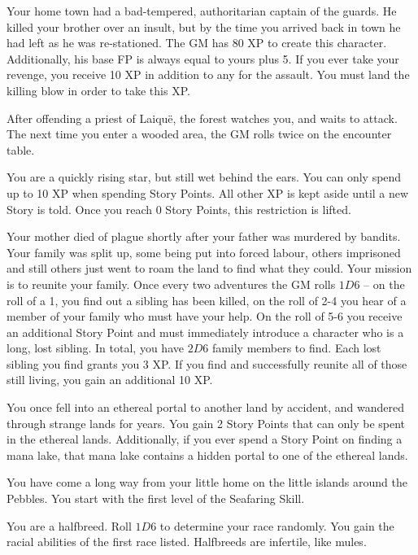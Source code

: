 \begin{multicols}{2}
\begin{list}{\addtocounter{list}{1}\textbf{:}}{\raggedleft}
	\item{Your home town had a bad-tempered, authoritarian captain of the guards.
He killed your brother over an insult, but by the time you arrived back in town he had left as he was re-stationed.
The GM has 80 XP to create this character.
Additionally, his base FP is always equal to yours plus 5.
If you ever take your revenge, you receive 10 XP in addition to any for the assault.
You must land the killing blow in order to take this XP.}
	\item{After offending a priest of Laiqu\"{e}, the forest watches you, and waits to attack.  The next time you enter a wooded area, the GM rolls twice on the encounter table.}

	\item{You are a quickly rising star, but still wet behind the ears.
	You can only spend up to 10 XP when spending Story Points.
	All other XP is kept aside until a new Story is told.
	Once you reach 0 Story Points, this restriction is lifted.}
	
	\item{Your mother died of plague shortly after your father was murdered by bandits.  Your family was split up, some being put into forced labour, others imprisoned and still others just went to roam the land to find what they could.  Your mission is to reunite your family.  Once every two adventures the GM rolls $1D6$ -- on the roll of a 1, you find out a sibling has been killed, on the roll of 2-4 you hear of a member of your family who must have your help.  On the roll of 5-6 you receive an additional Story Point and must immediately introduce a character who is a long, lost sibling.  In total, you have $2D6$ family members to find.  Each lost sibling you find grants you 3 XP.  If you find and successfully reunite all of those still living, you gain an additional 10 XP.}

	\item{You once fell into an ethereal portal to another land by accident, and wandered through strange lands for years.  You gain 2 Story Points that can only be spent in the ethereal lands.  Additionally, if you ever spend a Story Point on finding a mana lake, that mana lake contains a hidden portal to one of the ethereal lands.}

	\item{You have come a long way from your little home on the little islands around the Pebbles.  You start with the first level of the Seafaring Skill.}

	\item{You are a halfbreed.  Roll $1D6$ to determine your race randomly.  You gain the racial abilities of the first race listed.  Halfbreeds are infertile, like mules.}


\end{list}
\end{multicols}
